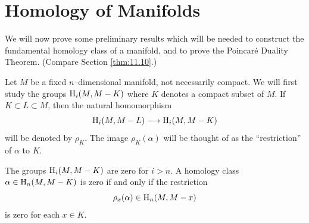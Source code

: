 \documentclass[../main]{subfiles}
\begin{document}
\section{Homology of Manifolds}\;
We will now prove some preliminary results which will be needed to construct the fundamental homology class of a manifold, and to prove the Poincaré Duality Theorem. (Compare Section \ref{thm:11.10}.) 

Let $M$ be a fixed $n$--dimensional manifold, not necessarily compact. We will first study the groups $\operatorname{H}_i(M, M - K)$ where $K$ denotes a compact subset of $M$. If $K \subset L \subset M$, then the natural homomorphism \[\operatorname{H}_i(M, M - L) \longrightarrow \operatorname{H}_i(M, M - K)\] will be denoted by $\rho_K$. The image $\rho_K(\alpha)$ will be thought of as the ``restriction'' of $\alpha$ to $K$. 

\begin{lemma}
\label{lem:A.7}
The groups $\operatorname{H}_i(M, M - K)$ are zero for $i > n$. A homology class $\alpha \in \operatorname{H}_n(M, M - K)$ is zero if and only if the restriction \[\rho_x(\alpha) \in \operatorname{H}_n(M, M - x)\] is zero for each $x \in K$. 
\end{lemma}
\end{document}
